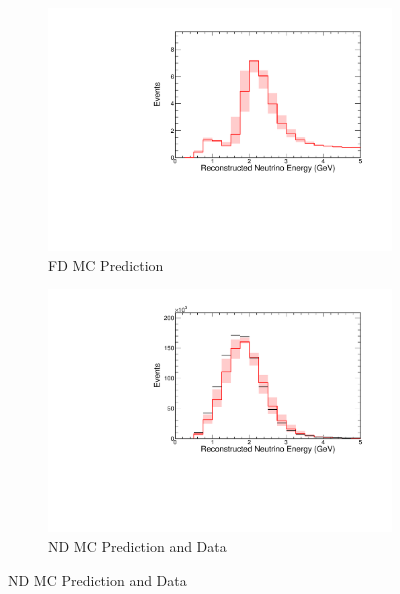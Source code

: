 {\begin{figure}
\begin{center}
\begin{subfigure}[c]{0.49\textwidth}
\includegraphics[width=\textwidth]{figures/systs/prediction/fd_mc_prediction_hadEAbs.pdf}
\caption*{FD MC Prediction}
\end{subfigure}
\begin{subfigure}[c]{0.49\textwidth}
\includegraphics[width=\textwidth]{figures/systs/prediction/nd_mc_prediction_hadEAbs.pdf}
\caption*{ND MC Prediction and Data}
\end{subfigure}

\vspace{20pt}


\end{center}
\end{figure}}
